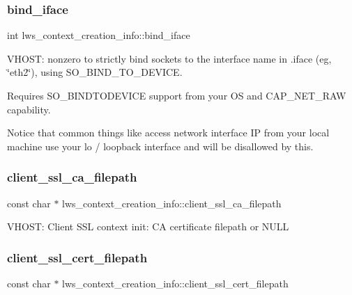 \subsubsection{\texorpdfstring{bind\+\_\+iface}{bind\_iface}}
{\footnotesize\ttfamily int lws\+\_\+context\+\_\+creation\+\_\+info\+::bind\+\_\+iface}

V\+H\+O\+ST\+: nonzero to strictly bind sockets to the interface name in .iface (eg, \char`\"{}eth2\char`\"{}), using S\+O\+\_\+\+B\+I\+N\+D\+\_\+\+T\+O\+\_\+\+D\+E\+V\+I\+CE.

Requires S\+O\+\_\+\+B\+I\+N\+D\+T\+O\+D\+E\+V\+I\+CE support from your OS and C\+A\+P\+\_\+\+N\+E\+T\+\_\+\+R\+AW capability.

Notice that common things like access network interface IP from your local machine use your lo / loopback interface and will be disallowed by this. \mbox{\label{structlws__context__creation__info_a8e2de485060968e7be1a6f1238d69521}} 
\subsubsection{\texorpdfstring{client\+\_\+ssl\+\_\+ca\+\_\+filepath}{client\_ssl\_ca\_filepath}}
{\footnotesize\ttfamily const char $\ast$ lws\+\_\+context\+\_\+creation\+\_\+info\+::client\+\_\+ssl\+\_\+ca\+\_\+filepath}

V\+H\+O\+ST\+: Client S\+SL context init\+: CA certificate filepath or N\+U\+LL \mbox{\label{structlws__context__creation__info_a3455d3866b9f9f40752ebad440382f50}} 
\subsubsection{\texorpdfstring{client\+\_\+ssl\+\_\+cert\+\_\+filepath}{client\_ssl\_cert\_filepath}}
{\footnotesize\ttfamily const char $\ast$ lws\+\_\+context\+\_\+creation\+\_\+info\+::client\+\_\+ssl\+\_\+cert\+\_\+filepath}

